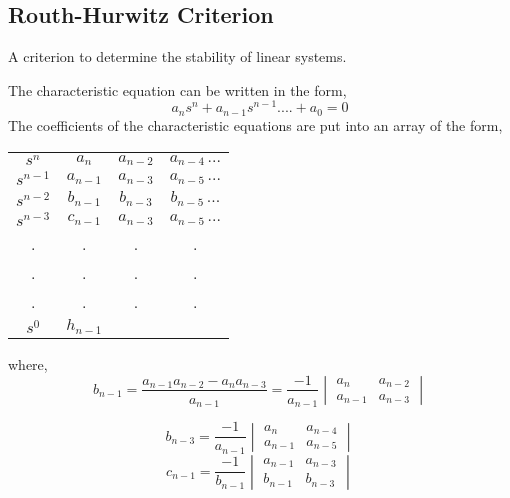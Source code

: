 \documentclass{article}
\begin{document}
    \subsection*{Routh-Hurwitz Criterion}
    A criterion to determine the stability of linear systems.\par
    The characteristic equation can be written in the form,
    \begin{equation*}
        a_{n}s^{n} + a_{n-1}s^{n-1}....+a_{0} = 0
    \end{equation*}
    The coefficients of the characteristic equations are put into an array of the form,
    \begin{center}
        \begin{tabular}{c| c c c}
            $s^{n}$&$a_{n}$&$a_{n-2}$&$a_{n-4}\, ...$\\
            $s^{n-1}$&$a_{n-1}$&$a_{n-3}$&$a_{n-5}\, ...$\\
            $s^{n-2}$&$b_{n-1}$&$b_{n-3}$&$b_{n-5}\, ...$\\
            $s^{n-3}$&$c_{n-1}$&$a_{n-3}$&$a_{n-5}\, ...$\\
            .&.&.&.\\
            .&.&.&.\\
            .&.&.&.\\
            $s^{0}$&$h_{n-1}$&&
        \end{tabular}
    \end{center}
    where,
    \begin{equation*}
        b_{n-1} = \frac{a_{n-1}a_{n-2} - a_{n}a_{n-3}}{a_{n-1}} = \frac{-1}{a_{n-1}}
            \begin{vmatrix}
                a_{n} & a_{n-2}\\
                a_{n-1} & a_{n-3}
            \end{vmatrix}
    \end{equation*}

    \begin{equation*}
        b_{n-3} = \frac{-1}{a_{n-1}}\begin{vmatrix}a_{n}&a_{n-4}\\a_{n-1}&a_{n-5} \end{vmatrix}
     \end{equation*}
    \begin{equation*}
        c_{n-1} = \frac{-1}{b_{n-1}}\begin{vmatrix}a_{n-1}&a_{n-3}\\b_{n-1}&b_{n-3} \end{vmatrix}
    \end{equation*}
\end{document}
